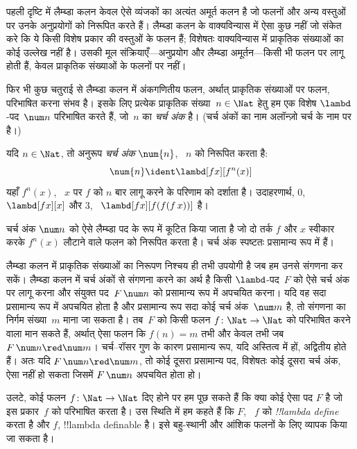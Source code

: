 \documentclass[../../../include/open-logic-section]{subfiles}
\begin{document}

पहली दृष्टि में लैम्ब्डा कलन केवल ऐसे व्यंजकों का अत्यंत अमूर्त कलन है जो
फलनों और अन्य वस्तुओं पर उनके अनुप्रयोगों को निरूपित करते हैं। लैम्ब्डा
कलन के वाक्यविन्यास में ऐसा कुछ नहीं जो संकेत करे कि ये किसी विशेष प्रकार
की वस्तुओं के फलन हैं; विशेषतः वाक्यविन्यास में प्राकृतिक संख्याओं का कोई
उल्लेख नहीं है। उसकी मूल संक्रियाएँ---अनुप्रयोग और लैम्ब्डा अमूर्तन---किसी
भी फलन पर लागू होती हैं, केवल प्राकृतिक संख्याओं के फलनों पर नहीं।

फिर भी कुछ चतुराई से लैम्ब्डा कलन में अंकगणितीय फलन, अर्थात् प्राकृतिक
संख्याओं पर फलन, परिभाषित करना संभव है। इसके लिए प्रत्येक प्राकृतिक
संख्या~$n \in \Nat$ हेतु हम एक विशेष $\lambd$-पद~$\num n$ परिभाषित करते
हैं, जो~$n$ का \emph{चर्च अंक} है। (चर्च अंकों का नाम अलॉन्ज़ो चर्च के नाम
पर है।)

\begin{defn}
  यदि $n \in \Nat$, तो अनुरूप \emph{चर्च अंक} $\num{n}$, ~$n$ को निरूपित
  करता है:
  \[
    \num{n} \ident \lambd[fx][f^n(x)]
  \]
  यहाँ $f^n(x)$, ~$x$ पर $f$ को $n$ बार लागू करने के परिणाम को दर्शाता
  है। उदाहरणार्थ, $\num{0}$, ~$\lambd[fx][x]$ और $\num{3}$,
  ~$\lambd[fx][f(f(f\,x))]$ है।
\end{defn}
  
चर्च अंक $\num n$ को ऐसे लैम्ब्डा पद के रूप में कूटित किया जाता है जो दो
तर्क $f$ और $x$ स्वीकार करके $f^n(x)$ लौटाने वाले फलन को निरूपित करता है।
चर्च अंक स्पष्टतः प्रसामान्य रूप में हैं।

लैम्ब्डा कलन में प्राकृतिक संख्याओं का निरूपण निश्चय ही तभी उपयोगी है जब
हम उनसे संगणना कर सकें। लैम्ब्डा कलन में चर्च अंकों से संगणना करने का अर्थ
है किसी $\lambd$-पद~$F$ को ऐसे चर्च अंक पर लागू करना और संयुक्त पद~$F\,
\num n$ को प्रसामान्य रूप में अपचयित करना। यदि वह सदा प्रसामान्य रूप में
अपचयित होता है और प्रसामान्य रूप सदा कोई चर्च अंक~$\num m$ है, तो संगणना
का निर्गम संख्या~$m$ माना जा सकता है। तब~$F$ को किसी फलन $f\colon \Nat
\to \Nat$ को परिभाषित करने वाला मान सकते हैं, अर्थात् ऐसा फलन कि $f(n) =
m$ तभी और केवल तभी जब $F\, \num n \red \num m$। चर्च--रॉसर गुण के कारण
प्रसामान्य रूप, यदि अस्तित्व में हों, अद्वितीय होते हैं। अतः यदि $F\, \num
n \red \num m$, तो कोई दूसरा प्रसामान्य पद, विशेषतः कोई दूसरा चर्च अंक,
ऐसा नहीं हो सकता जिसमें $F \, \num n$ अपचयित होता हो।

उलटे, कोई फलन $f\colon \Nat \to \Nat$ दिए होने पर हम पूछ सकते हैं कि क्या
कोई ऐसा पद $F$ है जो इस प्रकार~$f$ को परिभाषित करता है। उस स्थिति में हम
कहते हैं कि $F$, ~$f$ को \emph{!!{lambda define}} करता है और $f$,
!!{lambda definable} है। इसे बहु-स्थानी और आंशिक फलनों के लिए व्यापक किया
जा सकता है।
\end{document}
